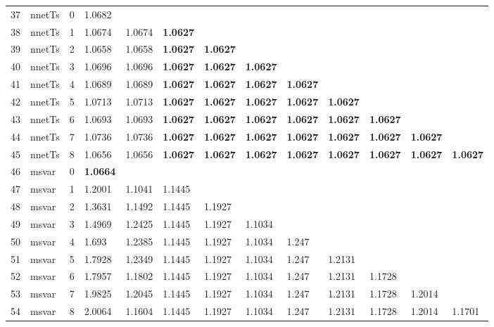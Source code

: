 \documentclass[10pt,a4paper]{article}
\begin{document}
\begin{table}[ht]
\begin{tabular}{rlrllllllllll}
   \hline
37 & nnetTs &     0 & 1.0682 &  &  &  &  &  &  &  &  &  \\ 
  38 & nnetTs &     1 & 1.0674 & 1.0674 & \textbf{1.0627} &  &  &  &  &  &  &  \\ 
  39 & nnetTs &     2 & 1.0658 & 1.0658 & \textbf{1.0627} & \textbf{1.0627} &  &  &  &  &  &  \\ 
  40 & nnetTs &     3 & 1.0696 & 1.0696 & \textbf{1.0627} & \textbf{1.0627} & \textbf{1.0627} &  &  &  &  &  \\ 
  41 & nnetTs &     4 & 1.0689 & 1.0689 & \textbf{1.0627} & \textbf{1.0627} & \textbf{1.0627} & \textbf{1.0627} &  &  &  &  \\ 
  42 & nnetTs &     5 & 1.0713 & 1.0713 & \textbf{1.0627} & \textbf{1.0627} & \textbf{1.0627} & \textbf{1.0627} & \textbf{1.0627} &  &  &  \\ 
  43 & nnetTs &     6 & 1.0693 & 1.0693 & \textbf{1.0627} & \textbf{1.0627} & \textbf{1.0627} & \textbf{1.0627} & \textbf{1.0627} & \textbf{1.0627} &  &  \\ 
  44 & nnetTs &     7 & 1.0736 & 1.0736 & \textbf{1.0627} & \textbf{1.0627} & \textbf{1.0627} & \textbf{1.0627} & \textbf{1.0627} & \textbf{1.0627} & \textbf{1.0627} &  \\ 
  45 & nnetTs &     8 & 1.0656 & 1.0656 & \textbf{1.0627} & \textbf{1.0627} & \textbf{1.0627} & \textbf{1.0627} & \textbf{1.0627} & \textbf{1.0627} & \textbf{1.0627} & \textbf{1.0627} \\ 
   \hline
46 & msvar &     0 & \textbf{1.0664} &  &  &  &  &  &  &  &  &  \\ 
  47 & msvar &     1 & 1.2001 & 1.1041 & 1.1445 &  &  &  &  &  &  &  \\ 
  48 & msvar &     2 & 1.3631 & 1.1492 & 1.1445 & 1.1927 &  &  &  &  &  &  \\ 
  49 & msvar &     3 & 1.4969 & 1.2425 & 1.1445 & 1.1927 & 1.1034 &  &  &  &  &  \\ 
  50 & msvar &     4 & 1.693 & 1.2385 & 1.1445 & 1.1927 & 1.1034 & 1.247 &  &  &  &  \\ 
  51 & msvar &     5 & 1.7928 & 1.2349 & 1.1445 & 1.1927 & 1.1034 & 1.247 & 1.2131 &  &  &  \\ 
  52 & msvar &     6 & 1.7957 & 1.1802 & 1.1445 & 1.1927 & 1.1034 & 1.247 & 1.2131 & 1.1728 &  &  \\ 
  53 & msvar &     7 & 1.9825 & 1.2045 & 1.1445 & 1.1927 & 1.1034 & 1.247 & 1.2131 & 1.1728 & 1.2014 &  \\ 
  54 & msvar &     8 & 2.0064 & 1.1604 & 1.1445 & 1.1927 & 1.1034 & 1.247 & 1.2131 & 1.1728 & 1.2014 & 1.1701 \\ 

\end{tabular}
\end{table}
\end{document}
